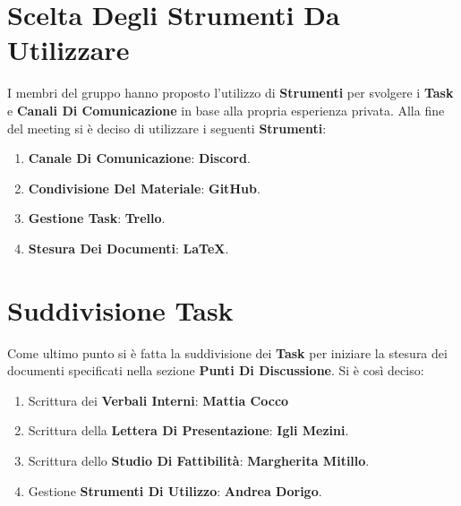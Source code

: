 \documentclass[a4paper,12pt]{report}
\begin{document}
	\chapter{Scelta Degli Strumenti Da Utilizzare}
	I membri del gruppo hanno proposto l'utilizzo di \textbf{Strumenti} per svolgere i \textbf{Task} e \textbf{Canali Di Comunicazione} in base alla propria esperienza privata.
	Alla fine del meeting si è deciso di utilizzare i seguenti \textbf{Strumenti}:
	\begin{enumerate}
		\item \textbf{Canale Di Comunicazione}: \textbf{Discord}.
		\item \textbf{Condivisione Del Materiale}: \textbf{GitHub}.
		\item \textbf{Gestione Task}: \textbf{Trello}.
		\item \textbf{Stesura Dei Documenti}: \textbf{LaTeX}.
	\end{enumerate}
	 
	\chapter{Suddivisione Task}
	Come ultimo punto si è fatta la suddivisione dei \textbf{Task} per iniziare la stesura dei documenti specificati nella sezione \textbf{Punti Di Discussione}.
	Si è così deciso:
	\begin{enumerate}
		\item Scrittura dei \textbf{Verbali Interni}: \textbf{Mattia Cocco}
		\item Scrittura della \textbf{Lettera Di Presentazione}: \textbf{Igli Mezini}.
		\item Scrittura dello \textbf{Studio Di Fattibilità}: \textbf{Margherita Mitillo}.
		\item Gestione \textbf{Strumenti Di Utilizzo}: \textbf{Andrea Dorigo}.
	\end{enumerate}
\end{document}
